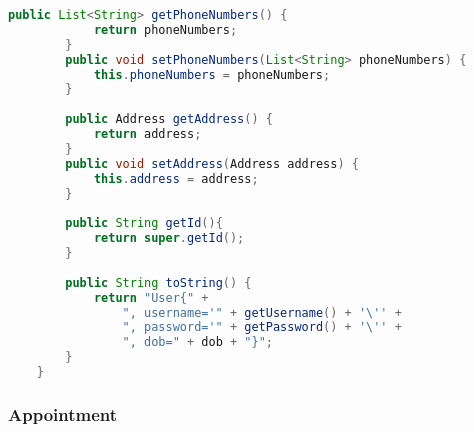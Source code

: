 \begin{lstlisting}[language=java]
		public List<String> getPhoneNumbers() {
			return phoneNumbers;
		}
		public void setPhoneNumbers(List<String> phoneNumbers) {
			this.phoneNumbers = phoneNumbers;
		}
		
		public Address getAddress() {
			return address;
		}
		public void setAddress(Address address) {
			this.address = address;
		}
		
		public String getId(){
			return super.getId();
		}
		
		public String toString() {
			return "User{" +
				", username='" + getUsername() + '\'' +
				", password='" + getPassword() + '\'' +
				", dob=" + dob + "}";
		}
	}
\end{lstlisting}

\subsubsection{Appointment}

